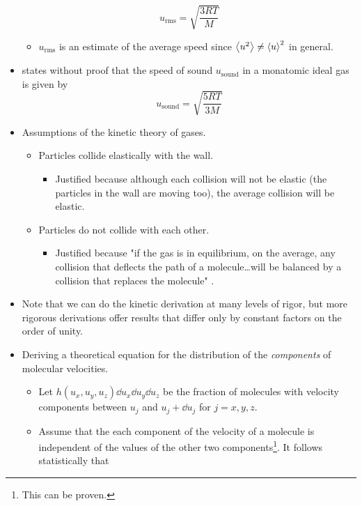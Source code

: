 \documentclass[../notes.tex]{subfiles}
\begin{document}
\begin{itemize}
\begin{equation*}
        u_\text{rms} = \sqrt{\frac{3RT}{M}}
    \end{equation*}
    \begin{itemize}
        \item $u_\text{rms}$ is an estimate of the average speed since $\left\langle{u^2}\right\rangle\neq\left\langle{u}\right\rangle^2$ in general.
    \end{itemize}
    \item \textcite{bib:McQuarrieSimon} states without proof that the speed of sound $u_\text{sound}$ in a monatomic ideal gas is given by
    \begin{equation*}
        u_\text{sound} = \sqrt{\frac{5RT}{3M}}
    \end{equation*}
    \item Assumptions of the kinetic theory of gases.
    \begin{itemize}
        \item Particles collide elastically with the wall.
        \begin{itemize}
            \item Justified because although each collision will not be elastic (the particles in the wall are moving too), the average collision will be elastic.
        \end{itemize}
        \item Particles do not collide with each other.
        \begin{itemize}
            \item Justified because "if the gas is in equilibrium, on the average, any collision that deflects the path of a molecule\dots will be balanced by a collision that replaces the molecule" \parencite[1015]{bib:McQuarrieSimon}.
        \end{itemize}
    \end{itemize}
    \item Note that we can do the kinetic derivation at many levels of rigor, but more rigorous derivations offer results that differ only by constant factors on the order of unity.
    \item Deriving a theoretical equation for the distribution of the \emph{components} of molecular velocities.
    \begin{itemize}
        \item Let $h(u_x,u_y,u_z)\dd{u_x}\dd{u_y}\dd{u_z}$ be the fraction of molecules with velocity components between $u_j$ and $u_j+\dd{u_j}$ for $j=x,y,z$.
        \item Assume that the each component of the velocity of a molecule is independent of the values of the other two components\footnote{This can be proven.}. It follows statistically that

\end{itemize}
\end{itemize}
\end{document}
